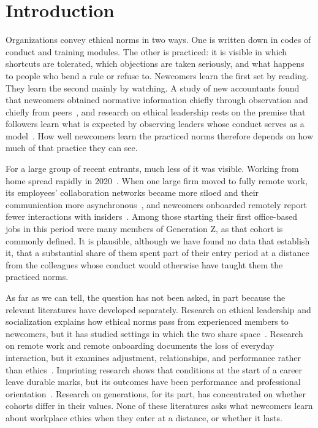 \section{Introduction}
Organizations convey ethical norms in two ways. One is written down in codes of conduct and training modules. The other is practiced: it is visible in which shortcuts are tolerated, which objections are taken seriously, and what happens to people who bend a rule or refuse to. Newcomers learn the first set by reading. They learn the second mainly by watching. A study of new accountants found that newcomers obtained normative information chiefly through observation and chiefly from peers~\citep{morrison1993newcomer}, and research on ethical leadership rests on the premise that followers learn what is expected by observing leaders whose conduct serves as a model~\citep{brown2005ethical}. How well newcomers learn the practiced norms therefore depends on how much of that practice they can see.

For a large group of recent entrants, much less of it was visible. Working from home spread rapidly in 2020~\citep{kniffin2021covid}. When one large firm moved to fully remote work, its employees' collaboration networks became more siloed and their communication more asynchronous~\citep{yang2022effects}, and newcomers onboarded remotely report fewer interactions with insiders~\citep{paik2026membership}. Among those starting their first office-based jobs in this period were many members of Generation Z, as that cohort is commonly defined. It is plausible, although we have found no data that establish it, that a substantial share of them spent part of their entry period at a distance from the colleagues whose conduct would otherwise have taught them the practiced norms.

As far as we can tell, the question has not been asked, in part because the relevant literatures have developed separately. Research on ethical leadership and socialization explains how ethical norms pass from experienced members to newcomers, but it has studied settings in which the two share space~\citep{brown2005ethical}. Research on remote work and remote onboarding documents the loss of everyday interaction, but it examines adjustment, relationships, and performance rather than ethics~\citep{paik2026membership}. Imprinting research shows that conditions at the start of a career leave durable marks, but its outcomes have been performance and professional orientation~\citep{tilcsik2014imprint}. Research on generations, for its part, has concentrated on whether cohorts differ in their values. None of these literatures asks what newcomers learn about workplace ethics when they enter at a distance, or whether it lasts.

